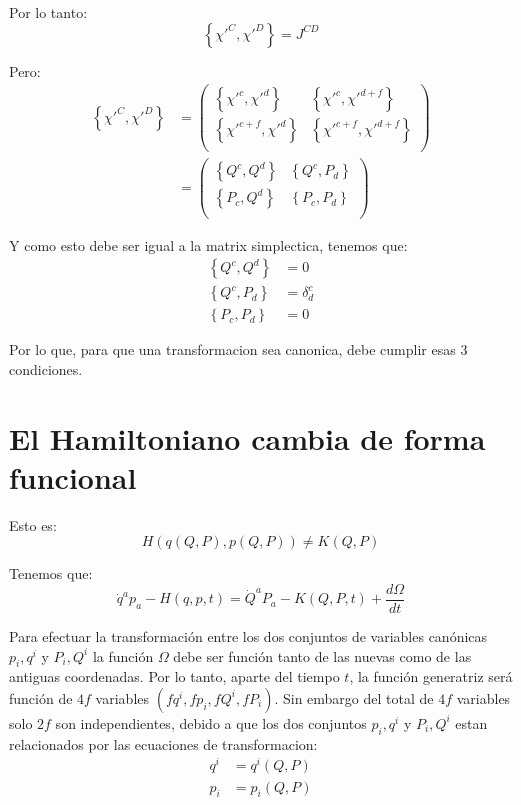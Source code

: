 \documentclass[12pt]{report}
\begin{document}
Por lo tanto:
	\begin{equation*}
		\left\{ \chi'^{C}, \chi'^{D}  \right\}	 = J^{CD}
	\end{equation*}

Pero:
	\begin{align*}
	 \left\{ \chi'^{C}, \chi'^{D}  \right\}	 &=
\begin{pmatrix}  \left\{ \chi'^{c}, \chi'^{d}  \right\} & \left\{ \chi'^{c}, \chi'^{d+f}  \right\} \\
				 \left\{ \chi'^{c+f}, \chi'^{d}  \right\} & \left\{ \chi'^{c+f}, \chi'^{d+f}  \right\} \\
\end{pmatrix} \\  &=
\begin{pmatrix}  \left\{ Q^{c}, Q^{d}  \right\} & \left\{ Q^{c}, P_{d}  \right\} \\
				 \left\{ P_{c}, Q^{d}  \right\} & \left\{ P_{c}, P_{d}  \right\} \\
\end{pmatrix}
	\end{align*}

Y como esto debe ser igual a la matrix simplectica, tenemos que:
	\begin{align*}
		\left\{ Q^{c}, Q^{d}  \right\} &= 0 \\
		\left\{ Q^{c}, P_{d}  \right\} &= \delta^{c}_{d} \\
		\left\{ P_{c}, P_{d}  \right\} &= 0
	\end{align*}

Por lo que, para que una transformacion sea canonica, debe cumplir esas 3 condiciones.

\section{El Hamiltoniano cambia de forma funcional}

Esto es:
	\begin{equation*}
		H\left(q(Q,P),p(Q,P) \right) \neq K(Q,P)
	\end{equation*}

Tenemos que:
	\begin{equation*}
		\dot{q}^{a}p_{a} - H(q,p,t) =  \dot{Q}^{a}P_{a} - K(Q,P,t)  + \frac{d\Omega}{dt}
	\end{equation*}

Para efectuar la transformaci\'on entre los dos conjuntos de variables can\'onicas ${p_{i},q^{i}}$ y ${P_{i},Q^{i}}$ la
funci\'on $\Omega$ debe ser funci\'on tanto de las nuevas como de las antiguas coordenadas. Por lo tanto, aparte del
tiempo $t$, la funci\'on generatriz ser\'a funci\'on de $4f$ variables $(fq^{i},fp_{i},fQ^{i},fP_{i})$. Sin embargo del total de $4f$
variables solo $2f$ son independientes, debido a que los dos conjuntos ${p_{i},q^{i}}$ y ${P_{i},Q^{i}}$ estan relacionados
por las ecuaciones de transformacion:
	\begin{align*}
		q^{i} &= q^{i}(Q,P) \\
		p_{i} &= p_{i}(Q,P) \\
	\end{align*}
	
\end{document}
